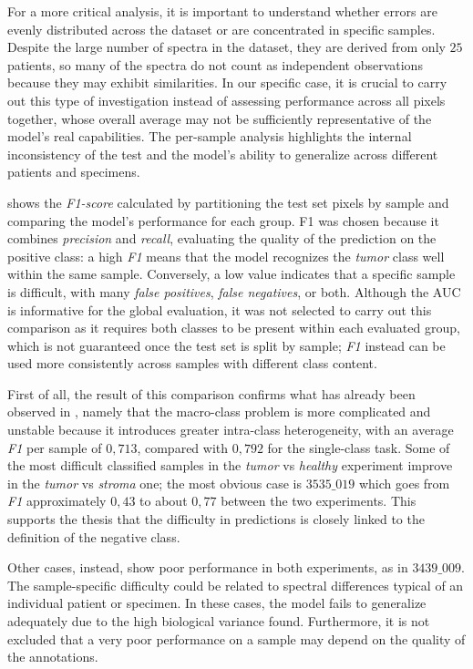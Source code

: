 For a more critical analysis, it is important to understand whether errors are evenly distributed across the dataset or are concentrated in specific samples. Despite the large number of spectra in the dataset, they are derived from only \(25\) patients, so many of the spectra do not count as independent observations because they may exhibit similarities. In our specific case, it is crucial to carry out this type of investigation instead of assessing performance across all pixels together, whose overall average may not be sufficiently representative of the model's real capabilities. The per-sample analysis highlights the internal inconsistency of the test and the model's ability to generalize across different patients and specimens. 


 shows the \textit{F1-score} calculated by partitioning the test set pixels by sample and comparing the model's performance for each group.
F1 was chosen because it combines \textit{precision} and \textit{recall}, evaluating the quality of the prediction on the positive class: a high \textit{F1} means that the model recognizes the \textit{tumor} class well within the same sample. Conversely, a low value indicates that a specific sample is difficult, with many \textit{false positives}, \textit{false negatives}, or both.
Although the AUC is informative for the global evaluation, it was not selected to carry out this comparison as it requires both classes to be present within each evaluated group, which is not guaranteed once the test set is split by sample; \textit{F1} instead can be used more consistently across samples with different class content.

First of all, the result of this comparison confirms what has already been observed in , namely that the macro-class problem is more complicated and unstable because it introduces greater intra-class heterogeneity, with an average \textit{F1} per sample of \(0{,}713\), compared with \(0{,}792\) for the single-class task.
Some of the most difficult classified samples in the \textit{tumor} vs \textit{healthy} experiment improve in the \textit{tumor} vs \textit{stroma} one; the most obvious case is \(3535\_019\) which goes from \textit{F1} approximately \(0{,}43\) to about \(0{,}77\) between the two experiments. This supports the thesis that the difficulty in predictions is closely linked to the definition of the negative class.

Other cases, instead, show poor performance in both experiments, as in \(3439\_009\). The sample-specific difficulty could be related to spectral differences typical of an individual patient or specimen. In these cases, the model fails to generalize adequately due to the high biological variance found.
Furthermore, it is not excluded that a very poor performance on a sample may depend on the quality of the annotations.


